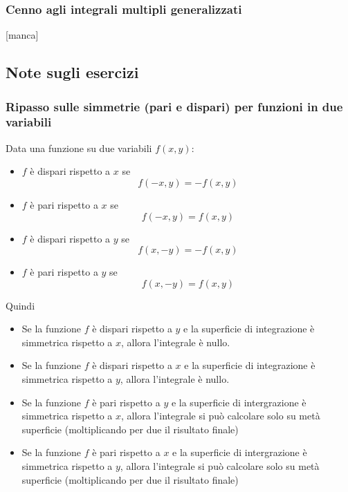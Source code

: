 \subsubsection{Cenno agli integrali multipli generalizzati}
[manca]
\subsection{Note sugli esercizi}
\subsubsection{Ripasso sulle simmetrie (pari e dispari) per funzioni in due variabili}
Data una funzione su due variabili $f(x,y)$:
\begin{itemize}
    \item $f$ è dispari rispetto a $x$ se 
    \[
        f(-x,y) = -f(x,y)
    \]
    \item $f$ è pari rispetto a $x$ se 
    \[
        f(-x,y) = f(x,y)
    \]
    \item $f$ è dispari rispetto a $y$ se 
    \[
        f(x,-y) = -f(x,y)
    \]
    \item $f$ è pari rispetto a $y$ se 
    \[
        f(x,-y) = f(x,y)
    \]
\end{itemize}
Quindi
\begin{itemize}
    \item Se la funzione $f$ è dispari rispetto a $y$ e la superficie di integrazione è simmetrica rispetto a $x$, allora l'integrale è nullo.
    \item Se la funzione $f$ è dispari rispetto a $x$ e la superficie di integrazione è simmetrica rispetto a $y$, allora l'integrale è nullo.
    \item Se la funzione $f$ è pari rispetto a $y$ e la superficie di intergrazione è simmetrica rispetto a $x$, allora l'integrale si può calcolare solo su metà superficie (moltiplicando per due il risultato finale)  
    \item Se la funzione $f$ è pari rispetto a $x$ e la superficie di intergrazione è simmetrica rispetto a $y$, allora l'integrale si può calcolare solo su metà superficie (moltiplicando per due il risultato finale)
\end{itemize}
